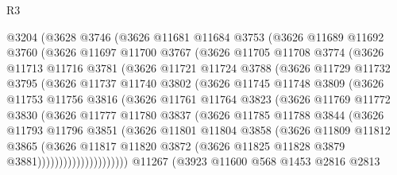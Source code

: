 \begin{lexlean}{R3}
\begin{coremodule}
    @3204
      (@3628
        @3746
        (@3626
          @11681
          @11684
          @3753
          (@3626
            @11689
            @11692
            @3760
            (@3626
              @11697
              @11700
              @3767
              (@3626
                @11705
                @11708
                @3774
                (@3626
                  @11713
                  @11716
                  @3781
                  (@3626
                    @11721
                    @11724
                    @3788
                    (@3626
                      @11729
                      @11732
                      @3795
                      (@3626
                        @11737
                        @11740
                        @3802
                        (@3626
                          @11745
                          @11748
                          @3809
                          (@3626
                            @11753
                            @11756
                            @3816
                            (@3626
                              @11761
                              @11764
                              @3823
                              (@3626
                                @11769
                                @11772
                                @3830
                                (@3626
                                  @11777
                                  @11780
                                  @3837
                                  (@3626
                                    @11785
                                    @11788
                                    @3844
                                    (@3626
                                      @11793
                                      @11796
                                      @3851
                                      (@3626
                                        @11801
                                        @11804
                                        @3858
                                        (@3626
                                          @11809
                                          @11812
                                          @3865
                                          (@3626
                                            @11817
                                            @11820
                                            @3872
                                            (@3626 @11825 @11828 @3879 @3881)))))))))))))))))))))
    @11267
    (@3923
      @11600
      @568
      @1453
      @2816
      @2813

\end{coremodule}
\end{lexlean}
